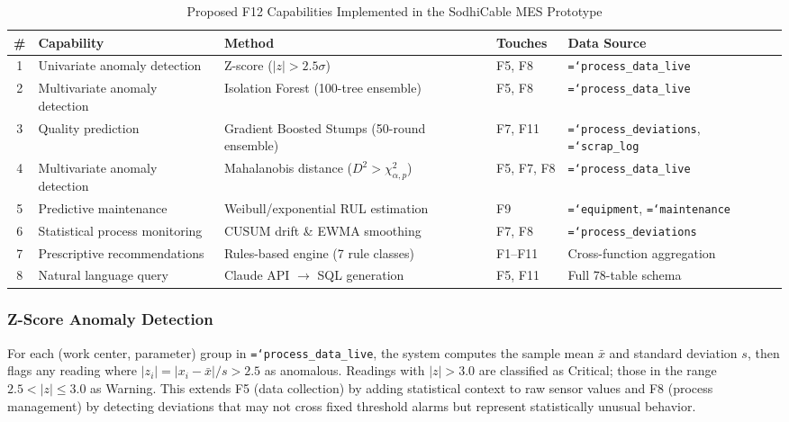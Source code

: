\documentclass[11pt]{article}
\newcommand{\tfield}[1]{\texttt{\hyphenchar\font=`\-\relax #1}}
\begin{document}
\begin{table}[H]\centering\small
\caption{Proposed F12 Capabilities Implemented in the SodhiCable MES Prototype}
\label{tab:f12capabilities}
\begin{tabularx}{\textwidth}{@{} c L{3.0cm} L{3.5cm} l L{2.5cm} @{}}
\toprule
\textbf{\#} & \textbf{Capability} & \textbf{Method} & \textbf{Touches} & \textbf{Data Source} \\
 & Univariate anomaly detection & Z-score ($|z| > 2.5\sigma$) & F5, F8 & \tfield{process\_data\_live} \\
2 & Multivariate anomaly detection & Isolation Forest (100-tree ensemble) & F5, F8 & \tfield{process\_data\_live} \\
3 & Quality prediction & Gradient Boosted Stumps (50-round ensemble) & F7, F11 & \tfield{process\_deviations}, \tfield{scrap\_log} \\
4 & Multivariate anomaly detection & Mahalanobis distance ($D^2 > \chi^2_{\alpha,p}$) & F5, F7, F8 & \tfield{process\_data\_live} \\
5 & Predictive maintenance & Weibull/exponential RUL estimation & F9 & \tfield{equipment}, \tfield{maintenance} \\
6 & Statistical process monitoring & CUSUM drift \& EWMA smoothing & F7, F8 & \tfield{process\_deviations} \\
7 & Prescriptive recommendations & Rules-based engine (7 rule classes) & F1--F11 & Cross-function aggregation \\
8 & Natural language query & Claude API $\to$ SQL generation & F5, F11 & Full 78-table schema \\
\bottomrule
\end{tabularx}
\end{table}

\subsubsection{Z-Score Anomaly Detection}

For each (work center, parameter) group in \tfield{process\_data\_live}, the system computes the sample mean $\bar{x}$ and standard deviation $s$, then flags any reading where $|z_i| = |x_i - \bar{x}|/s > 2.5$ as anomalous.  Readings with $|z| > 3.0$ are classified as Critical; those in the range $2.5 < |z| \leq 3.0$ as Warning.  This extends F5 (data collection) by adding statistical context to raw sensor values and F8 (process management) by detecting deviations that may not cross fixed threshold alarms but represent statistically unusual behavior.
\end{document}
